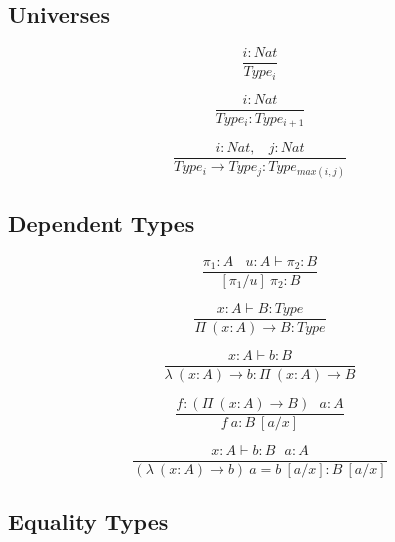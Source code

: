 \documentclass[11pt,oneside]{article}
\begin{document}
\subsection{Universes}

\begin{equation}
\tag{sorts}
\dfrac
  {i : Nat}
  {Type_i}
\end{equation}

\begin{equation}
\tag{axioms}
\dfrac
  {i: Nat}
  {Type_i : Type_{i+1}}
\end{equation}

\begin{equation}
\tag{rules}
\dfrac
  {i : Nat,\ \ \ \ j : Nat}
  {Type_i \rightarrow Type_{j} : Type_{max(i,j)}}
\end{equation}

  \subsection{Dependent Types}

\begin{equation}
\tag{subst}
\dfrac
  {\pi_1 : A\ \ \ \ u:A \vdash \pi_2 : B}
  {[\pi_1/u]\ \pi_2 : B}
\end{equation}

\begin{equation}
\tag{$\Pi$-formation}
\dfrac
  {x:A \vdash B : Type}
  {\Pi\ (x:A) \rightarrow B : Type}
\end{equation}

\begin{equation}
\tag{$\lambda$-intro}
\dfrac
  {x:A \vdash b : B}
  {\lambda\ (x:A) \rightarrow b : \Pi\ (x: A) \rightarrow B }
\end{equation}

\begin{equation}
\tag{$App$-elimination}
\dfrac
  {f: (\Pi\ (x:A) \rightarrow B)\ \ \ a: A}
  {f\ a : B\ [a/x]}
\end{equation}

\begin{equation}
\tag{$\beta$-computation}
\dfrac
  {x:A \vdash b: B\ \ \ a:A}
  {(\lambda\ (x:A) \rightarrow b)\ a = b\ [a/x] : B\ [a/x]}
\end{equation}

  \subsection{Equality Types}
\end{document}
